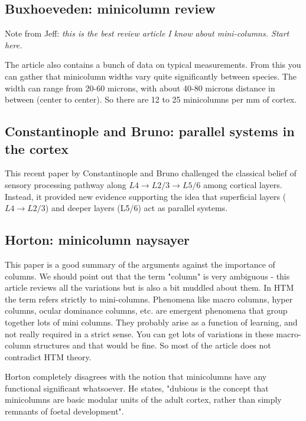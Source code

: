 \documentclass{article} %
\begin{document}
\subsection{Buxhoeveden: minicolumn review}

\cite{Buxhoeveden2002} Note from Jeff: \emph{this is the best review article I
know about mini-columns. Start here.}

The article also contains a bunch of data on typical measurements. From this you
can gather that minicolumn widths vary quite significantly between species.  The
width can range from 20-60 microns, with about 40-80 microns distance in between
(center to center).  So there are 12 to 25 minicolumns per mm of cortex.

\subsection{Constantinople and Bruno: parallel systems in the cortex}
This recent paper by Constantinople and Bruno \cite{Constantinople2013}
challenged the  classical belief of sensory processing pathway along
$L4\rightarrow L2/3 \rightarrow L5/6$ among cortical layers.  Instead, it
provided new evidence supporting the idea that superficial layers
($L4\rightarrow L2/3$) and  deeper layers (L5/6) act as parallel systems.

\subsection{Horton: minicolumn naysayer}

This paper \cite{Horton2005} is a good summary of the arguments against the
importance of columns. We should point out that the term "column" is very
ambiguous - this article reviews all the variations but is also a bit muddled
about them. In HTM the term  refers strictly to mini-columns. Phenomena like
macro columns, hyper columns, ocular dominance columns, etc. are emergent
phenomena that group together lots of mini columns. They probably arise as a
function of learning, and not really required in a strict sense. You can get
lots of variations in these macro-column structures and that would be fine. So
most of the article does not contradict HTM theory.

Horton completely disagrees  with the notion  that minicolumns have
any functional significant whatsoever.  He states, "dubious is the concept that
minicolumns are basic modular units of the adult cortex, rather than simply
remnants of foetal development".
\end{document}
